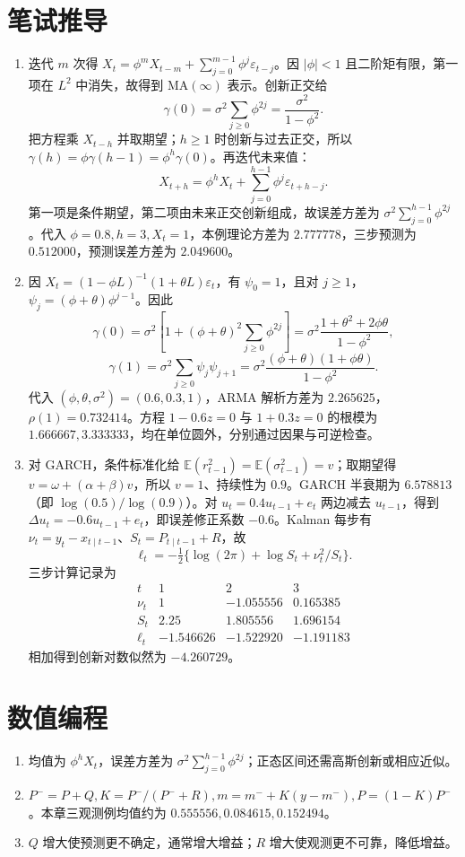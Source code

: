 \section*{笔试推导}
\begin{enumerate}[leftmargin=*,start=4]
\item 迭代 $m$ 次得 $X_t=\phi^mX_{t-m}+\sum_{j=0}^{m-1}\phi^j\varepsilon_{t-j}$。因 $|\phi|<1$ 且二阶矩有限，第一项在 $L^2$ 中消失，故得到 MA$(\infty)$ 表示。创新正交给
\[
\gamma(0)=\sigma^2\sum_{j\ge0}\phi^{2j}=\frac{\sigma^2}{1-\phi^2}.
\]
把方程乘 $X_{t-h}$ 并取期望；$h\ge1$ 时创新与过去正交，所以 $\gamma(h)=\phi\gamma(h-1)=\phi^h\gamma(0)$。再迭代未来值：
\[
X_{t+h}=\phi^hX_t+\sum_{j=0}^{h-1}\phi^j\varepsilon_{t+h-j}.
\]
第一项是条件期望，第二项由未来正交创新组成，故误差方差为 $\sigma^2\sum_{j=0}^{h-1}\phi^{2j}$。代入 $\phi=0.8,h=3,X_t=1$，本例理论方差为 $2.777778$，三步预测为 $0.512000$，预测误差方差为 $2.049600$。

\item 因 $X_t=(1-\phi L)^{-1}(1+\theta L)\varepsilon_t$，有 $\psi_0=1$，且对 $j\ge1$，$\psi_j=(\phi+\theta)\phi^{j-1}$。因此
\[
\gamma(0)=\sigma^2\left[1+(\phi+\theta)^2\sum_{j\ge0}\phi^{2j}\right]
=\sigma^2\frac{1+\theta^2+2\phi\theta}{1-\phi^2},
\]
\[
\gamma(1)=\sigma^2\sum_{j\ge0}\psi_j\psi_{j+1}
=\sigma^2\frac{(\phi+\theta)(1+\phi\theta)}{1-\phi^2}.
\]
代入 $(\phi,\theta,\sigma^2)=(0.6,0.3,1)$，ARMA 解析方差为 $2.265625$，$\rho(1)=0.732414$。方程 $1-0.6z=0$ 与 $1+0.3z=0$ 的根模为 $1.666667,3.333333$，均在单位圆外，分别通过因果与可逆检查。

\item 对 GARCH，条件标准化给 $\mathbb E(r_{t-1}^2)=\mathbb E(\sigma_{t-1}^2)=v$；取期望得 $v=\omega+(\alpha+\beta)v$，所以 $v=1$、持续性为 $0.9$。GARCH 半衰期为 $6.578813$（即 $\log(0.5)/\log(0.9)$）。对 $u_t=0.4u_{t-1}+e_t$ 两边减去 $u_{t-1}$，得到 $\Delta u_t=-0.6u_{t-1}+e_t$，即误差修正系数 $-0.6$。Kalman 每步有 $\nu_t=y_t-x_{t\mid t-1}$、$S_t=P_{t\mid t-1}+R$，故
\[
\ell_t=-\tfrac12\{\log(2\pi)+\log S_t+\nu_t^2/S_t\}.
\]
三步计算记录为
\[
\begin{array}{c|ccc}
t&1&2&3\\\hline
\nu_t&1&-1.055556&0.165385\\
S_t&2.25&1.805556&1.696154\\
\ell_t&-1.546626&-1.522920&-1.191183
\end{array}
\]
相加得到创新对数似然为 $-4.260729$。
\end{enumerate}

\section*{数值编程}
\begin{enumerate}[leftmargin=*]
  \item 均值为 $\phi^hX_t$，误差方差为 $\sigma^2\sum_{j=0}^{h-1}\phi^{2j}$；正态区间还需高斯创新或相应近似。
  \item $P^-=P+Q,K=P^-/(P^-+R),m=m^-+K(y-m^-),P=(1-K)P^-$。本章三观测例均值约为 $0.555556,0.084615,0.152494$。
  \item $Q$ 增大使预测更不确定，通常增大增益；$R$ 增大使观测更不可靠，降低增益。
\end{enumerate}

